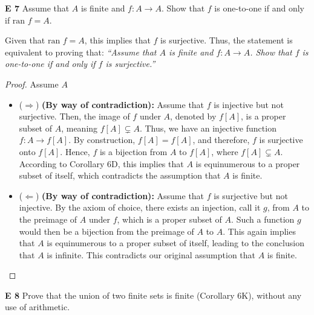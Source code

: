 \begin{question}
    \textbf{E 7}
    Assume that $A$ is finite and $f: A \rightarrow A$. Show that $f$ is one-to-one if and only if $\text{ran } f = A$.
\end{question}
Given that $\text{ran } f = A$, this implies that $f$ is surjective.
Thus, the statement is equivalent to proving that: \textit{``Assume that $A$ is finite and $f: A \rightarrow A$. Show that $f$ is one-to-one if and only if $f$ is surjective.''}
\begin{proof}
Assume $A$ 
    \begin{itemize}
        \item (\(\Rightarrow\)) \textbf{(By way of contradiction):} Assume that $f$ is injective but not surjective. Then, the image of $f$ under $A$, denoted by $f[A]$, is a proper subset of $A$, meaning $f[A] \subsetneq A$. Thus, we have an injective function $f: A \rightarrow f[A]$. By construction, $f[A] = f[A]$, and therefore, $f$ is surjective onto $f[A]$. Hence, $f$ is a bijection from $A$ to $f[A]$, where $f[A] \subsetneq A$. According to Corollary 6D, this implies that $A$ is equinumerous to a proper subset of itself, which contradicts the assumption that $A$ is finite.

        \item (\(\Leftarrow\)) \textbf{(By way of contradiction):} Assume that $f$ is surjective but not injective. By the axiom of choice, there exists an injection, call it $g$, from $A$ to the preimage of $A$ under $f$, which is a proper subset of $A$. Such a function $g$ would then be a bijection from the preimage of $A$ to $A$. This again implies that $A$ is equinumerous to a proper subset of itself, leading to the conclusion that $A$ is infinite. This contradicts our original assumption that $A$ is finite.
    \end{itemize}
\end{proof}
\begin{question}
    \textbf{E 8}
    Prove that the union of two finite sets is finite (Corollary 6K), without any use of arithmetic.
\end{question}
